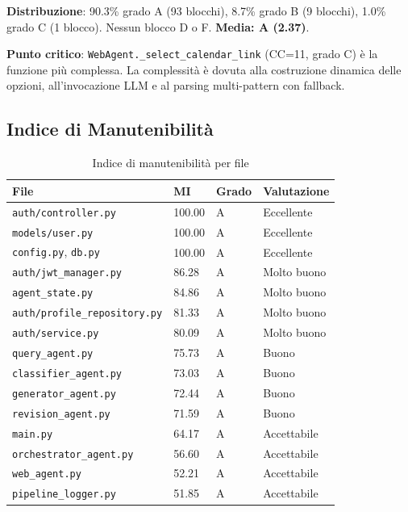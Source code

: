 \documentclass[a4paper,12pt]{report}
\begin{document}
\textbf{Distribuzione}: 90.3\% grado A (93 blocchi), 8.7\% grado B (9 blocchi), 1.0\% grado C (1 blocco). Nessun blocco D o F. \textbf{Media: A (2.37)}.

\textbf{Punto critico}: \texttt{WebAgent.\_select\_calendar\_link} (CC=11, grado C) è la funzione più complessa. La complessità è dovuta alla costruzione dinamica delle opzioni, all'invocazione LLM e al parsing multi-pattern con fallback.

\subsection{Indice di Manutenibilità}

\begin{table}[H]
\centering
\small
\begin{tabularx}{\textwidth}{l l l l}
\toprule
\textbf{File} & \textbf{MI} & \textbf{Grado} & \textbf{Valutazione} \\
\midrule
\texttt{auth/controller.py} & 100.00 & A & Eccellente \\
\texttt{models/user.py} & 100.00 & A & Eccellente \\
\texttt{config.py}, \texttt{db.py} & 100.00 & A & Eccellente \\
\texttt{auth/jwt\_manager.py} & 86.28 & A & Molto buono \\
\texttt{agent\_state.py} & 84.86 & A & Molto buono \\
\texttt{auth/profile\_repository.py} & 81.33 & A & Molto buono \\
\texttt{auth/service.py} & 80.09 & A & Molto buono \\
\texttt{query\_agent.py} & 75.73 & A & Buono \\
\texttt{classifier\_agent.py} & 73.03 & A & Buono \\
\texttt{generator\_agent.py} & 72.44 & A & Buono \\
\texttt{revision\_agent.py} & 71.59 & A & Buono \\
\texttt{main.py} & 64.17 & A & Accettabile \\
\texttt{orchestrator\_agent.py} & 56.60 & A & Accettabile \\
\texttt{web\_agent.py} & 52.21 & A & Accettabile \\
\texttt{pipeline\_logger.py} & 51.85 & A & Accettabile \\
\bottomrule
\end{tabularx}
\caption{Indice di manutenibilità per file}
\end{table}
\end{document}
